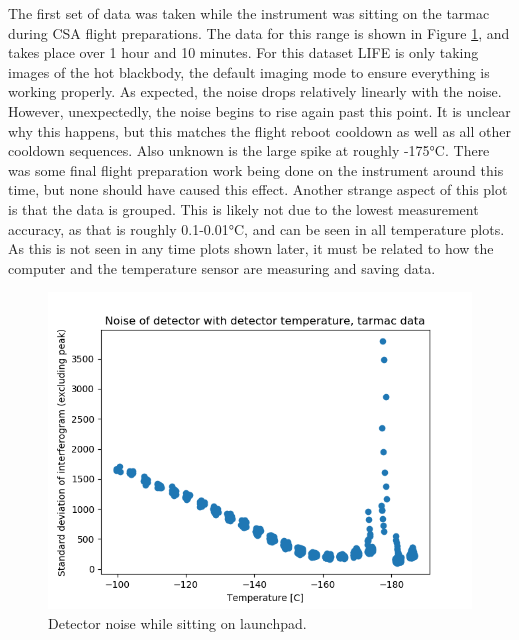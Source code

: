The first set of data was taken while the instrument was sitting on the tarmac during CSA flight preparations. The data for this range is shown in Figure \ref{fig:tarmac_noise}, and takes place over 1 hour and 10 minutes. For this dataset LIFE is only taking images of the hot blackbody, the default imaging mode to ensure everything is working properly. As expected, the noise drops relatively linearly with the noise. However, unexpectedly, the noise begins to rise again past this point. It is unclear why this happens, but this matches the flight reboot cooldown as well as all other cooldown sequences. Also unknown is the large spike at roughly -175°C. There was some final flight preparation work being done on the instrument around this time, but none should have caused this effect. Another strange aspect of this plot is that the data is grouped. This is likely not due to the lowest measurement accuracy, as that is roughly 0.1-0.01°C, and can be seen in all temperature plots. As this is not seen in any time plots shown later, it must be related to how the computer and the temperature sensor are measuring and saving data.

\begin{figure}[h]
\centering
  \includegraphics[width=0.8\linewidth]{mct_noise_temp_plots/tarmac_noisevstemp_invertedx.png}
  \caption{Detector noise while sitting on launchpad.}
  \label{fig:tarmac_noise}
\end{figure}

